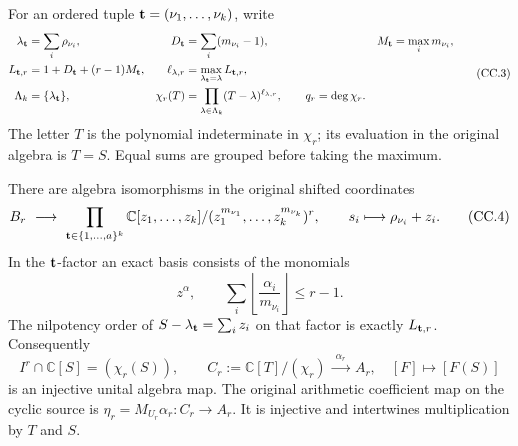 For an ordered tuple \({\bf t}=(\nu_1,\ldots,\nu_k)\), write
\[
\begin{aligned}
 \lambda_{\bf t}&=\sum_i\rho_{\nu_i},&
 D_{\bf t}&=\sum_i(m_{\nu_i}-1),&
 M_{\bf t}&=\max_i m_{\nu_i},\\
 L_{{\bf t},r}&=1+D_{\bf t}+(r-1)M_{\bf t},&
 \ell_{\lambda,r}&=\max_{\lambda_{\bf t}=\lambda}L_{{\bf t},r},\\
 \Lambda_k&=\{\lambda_{\bf t}\},&
 \chi_r(T)&=\prod_{\lambda\in\Lambda_k}(T-\lambda)^{\ell_{\lambda,r}},
 \qquad q_r=\deg\chi_r .
\end{aligned}
\tag{CC.3}
\]
The letter \(T\) is the polynomial indeterminate in \(\chi_r\);
its evaluation in the original algebra is \(T=S\).
Equal sums are grouped before taking the maximum.

\begin{theorem}
There are algebra isomorphisms in the original shifted coordinates
\[
 B_r\ \longrightarrow\
 \prod_{{\bf t}\in\{1,\ldots,a\}^k}
 \mathbb C[z_1,\ldots,z_k]/(z_1^{m_{\nu_1}},\ldots,z_k^{m_{\nu_k}})^r,
 \qquad s_i\longmapsto\rho_{\nu_i}+z_i.
 \tag{CC.4}
\]
In the \({\bf t}\)-factor an exact basis consists of the monomials
\[
 z^\alpha,\qquad
 \sum_i\left\lfloor\frac{\alpha_i}{m_{\nu_i}}\right\rfloor\leq r-1.
 \tag{CC.5}
\]
The nilpotency order of \(S-\lambda_{\bf t}=\sum_i z_i\) on that
factor is exactly \(L_{{\bf t},r}\).  Consequently
\[
 I^r\cap\mathbb C[S]=(\chi_r(S)),\qquad
 C_r:=\mathbb C[T]/(\chi_r)
 \ \xrightarrow{\ \alpha_r\ }\ A_r,\quad [F]\longmapsto[F(S)]
 \tag{CC.6}
\]
is an injective unital algebra map.  The original arithmetic coefficient
map on the cyclic source is
\(\eta_r=M_{U_r}\alpha_r:C_r\longrightarrow A_r\).
It is injective and intertwines multiplication by \(T\) and \(S\).
\end{theorem}
